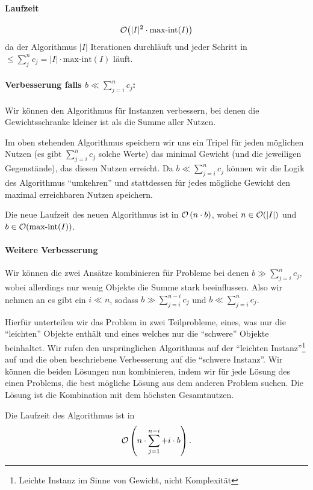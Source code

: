 \paragraph{Laufzeit} \[\mathcal{O} \big( |I|^2 \cdot \text{max-int}(I) \big)\] da der 
Algorithmus $|I|$ Iterationen durchläuft und
jeder Schritt in $\leq \sum_j^n c_j = |I| \cdot \text{max-int}(I)$ läuft.

\paragraph{Verbesserung falls \(b \ll \sum_{j=i}^{n} c_j\):}
Wir können den Algorithmus für Instanzen verbessern, 
bei denen die Gewichtsschranke kleiner ist als die Summe aller Nutzen.

Im oben stehenden Algorithmus speichern wir uns ein Tripel für jeden möglichen 
Nutzen (es gibt \(\sum_{j=i}^{n} c_j\) solche Werte) das minimal Gewicht (und 
die jeweiligen Gegenstände), das diesen Nutzen erreicht. Da \(b \ll \sum_{j=i}^{n} c_j\) 
können wir die Logik des Algorithmus ``umkehren'' und stattdessen für jedes 
mögliche Gewicht den maximal erreichbaren Nutzen speichern. 

Die neue Laufzeit des neuen Algorithmus ist in \(\mathcal{O} \left (n \cdot b\right)\), 
wobei \(n \in \mathcal{O}(|I|)\) und \(b \in \mathcal{O}(\text{max-int}(I))\).

\paragraph{Weitere Verbesserung} Wir können die zwei Ansätze kombinieren für 
Probleme bei denen \(b \gg \sum_{j=i}^{n} c_j\), wobei allerdings nur wenig 
Objekte die Summe stark beeinflussen. Also wir nehmen an es gibt ein \(i \ll n\), 
sodass \(b \gg \sum_{j=i}^{n - i} c_j\) und \(b \ll \sum_{j=i}^{n} c_j\).

Hierfür unterteilen wir das Problem in zwei Teilprobleme, eines, was nur die 
``leichten'' Objekte enthält und eines welches nur die ``schwere'' Objekte beinhaltet. 
Wir rufen den ursprünglichen Algorithmus auf der ``leichten Instanz''\footnote{Leichte 
Instanz im Sinne von Gewicht, nicht Komplexität} auf und die oben beschriebene 
Verbesserung auf die ``schwere Instanz''. Wir können die beiden Lösungen nun kombinieren, 
indem wir für jede Lösung des einen Problems, die best mögliche Lösung aus dem anderen 
Problem suchen. Die Lösung ist die Kombination mit dem höchsten Gesamtnutzen.

Die Laufzeit des Algorithmus ist in
\[\mathcal{O}\left(n \cdot \sum_{j = 1}^{n-i} + i \cdot b \right).\]
